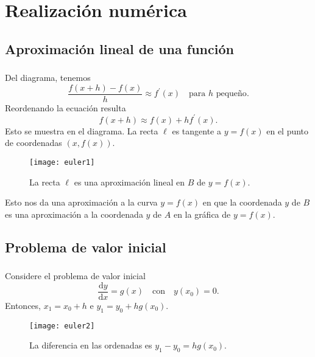 \section{Realización numérica}

\subsection{Aproximación lineal de una función}
\begin{frame}
\frametitle{\subsecname}

\begin{minipage}{0.45\paperwidth}
	Del diagrama, tenemos \[ \frac{f\left(x+h\right)-f\left(x\right)}{h}\approx f^{\prime}\left(x\right)\quad\text{para }h\text{ pequeño}. \] Reordenando la ecuación resulta \[ f\left(x+h\right)\approx f\left(x\right)+hf^{\prime}\left(x\right). \] Esto se muestra en el diagrama. La recta $\ell$ es tangente a $y=f\left(x\right)$	en el punto de coordenadas $\left(x,f\left(x\right)\right)$.
\end{minipage}
\hfill
\begin{minipage}{0.45\paperwidth}
	\begin{figure}
		\centering
		\texttt{[image: euler1]}
		\caption{La recta $\ell$ es una aproximación lineal en $B$ de $y=f\left(x\right)$.}
	\end{figure}
\end{minipage}
\vfill
\begin{remark}
	Esto nos da una aproximación a la curva $y=f\left(x\right)$ en que la coordenada $y$ de $B$ es una aproximación a la coordenada $y$ de $A$ en la gráfica de $y=f\left(x\right)$.
\end{remark}
\end{frame}

\subsection{Problema de valor inicial}

\begin{frame}
	\frametitle{\subsecname}
	\begin{minipage}{0.45\paperwidth}
		Considere el problema de valor inicial \[ \frac{\mathrm{d}y}{\mathrm{d}x}=g\left(x\right)\quad\text{con}\quad y\left(x_{0}\right)=0. \] Entonces, $x_{1}=x_{0}+h$ e $y_{1}=y_{0}+hg\left(x_{0}\right)$.
	\end{minipage}
	\hfill
	\begin{minipage}{0.45\paperwidth}
		\begin{figure}
			\centering
			\texttt{[image: euler2]}
			\caption{La diferencia en las ordenadas es $y_{1}-y_{0}=hg\left(x_{0}\right)$.}
		\end{figure}
	\end{minipage}
\end{frame}

